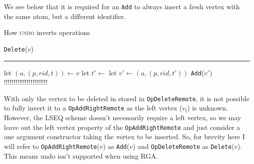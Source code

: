 \documentclass[diss.tex]{subfiles}
\begin{document}
We see below that it is required for an \texttt{Add} to always insert a fresh vertex with the same atom, but a different identifier.
%
\begin{algorithm}[H]
\caption*{How \textsc{undo} inverts operations}
\begin{algorithmic}[1]
\State \Return \texttt{Delete}($v$)
\EndFunction
\end{algorithmic}

\hrule 

\begin{algorithmic}[1]
\State let $(a, (p, rid, t)) \gets v$
\State let $t' \gets $ 
\State let $v' \gets (a, (p, rid, t'))$
\State \Return \texttt{Add}($v'$)     !!!!!!!!!!!!!!!!!!!!!!!
\EndFunction
\end{algorithmic}
\end{algorithm}
%
%

With only the vertex to be deleted in stored in \texttt{OpDeleteRemote}, it is not possible to fully invert it to a \texttt{OpAddRightRemote} as the left vertex ($v_l$) is unknown. However, the LSEQ scheme doesn't necessarily require a left vertex, so we may leave out the left vertex property of the \texttt{OpAddRightRemote} and just consider a one argument constructor taking the vertex to be inserted. So, for brevity here I will refer to \texttt{OpAddRightRemote}($v$) as \texttt{Add}($v$) and \texttt{OpDeleteRemote} as \texttt{Delete}($v$). This means undo isn't supported when using RGA. 



\end{document}

